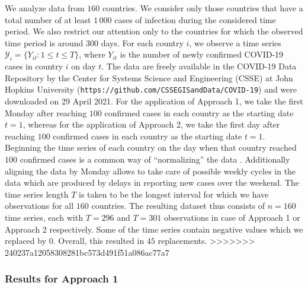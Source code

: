\documentclass[a4paper,12pt]{article}
\numberwithin{equation}{section}
\begin{document}
We analyze data from $160$ countries. We consider only those countries that have a total number of at least $1\,000$ cases of infection during the considered time period. We also restrict our attention only to the countries for which the observed time period is around $300$ days. For each country $i$, we observe a time series $\mathcal{Y}_i = \{ Y_{it}: 1 \le t \le T \}$, where $Y_{it}$ is the number of newly confirmed COVID-19 cases in country $i$ on day $t$. The data are freely available in the COVID-19 Data Repository by the Center for Systems Science and Engineering (CSSE) at John Hopkins University (\texttt{https://github.com/CSSEGISandData/COVID-19}) and were downloaded on 29 April 2021. For the application of Approach 1, we take the first Monday after reaching $100$ confirmed cases in each country as the starting date $t=1$, whereas for the application of Approach 2, we take the first day after reaching $100$ confirmed cases in each country as the starting date $t=1$.
Beginning the time series of each country on the day when that country reached $100$ confirmed cases is a common way of ``normalizing'' the data \citep[see e.g.][]{Cohen2020}. Additionally aligning the data by Monday allows to take care of possible weekly cycles in the data which are produced by delays in reporting new cases over the weekend. 
The time series length $T$ is taken to be the longest interval for which we have observations for all $160$ countries. The resulting dataset thus consists of $n = 160$ time series, each with $T = 296$ and $T = 301$ observations in case of Approach 1 or Approach 2 respectively. Some of the time series contain negative values which we replaced by $0$. Overall, this resulted in $45$ replacements.
>>>>>>> 240237a12058308281bc573d491f51a086ac77a7


\subsubsection{Results for Approach 1}\label{subsubsec:method1}
\end{document}
